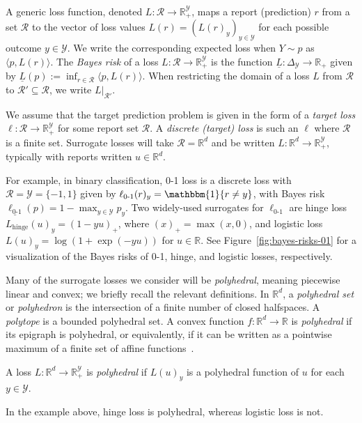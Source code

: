 \documentclass[twoside,11pt]{article}
\newcommand{\Comments}{1}
\newcommand{\mynote}[2]{\ifnum\Comments=1\textcolor{#1}{#2}\fi}
\newcommand{\jessie}[1]{\mynote{teal}{[JF: #1]}}
\newcommand{\reals}{\mathbb{R}}
\newcommand{\simplex}{\Delta_\Y}
\newcommand{\R}{\mathcal{R}}
\newcommand{\U}{\mathcal{U}}
\newcommand{\Y}{\mathcal{Y}}
\newcommand{\risk}[1]{\underline{#1}}
\newcommand{\inprod}[2]{\langle #1, #2 \rangle}%
\newcommand{\ones}{\mathbbm{1}}
\newcommand{\Ind}[1]{\ones\{#1\}}
\newcommand{\hinge}{L_{\mathrm{hinge}}}
\newcommand{\ellzo}{\ell_{\text{0-1}}}
\begin{document}
A generic loss function, denoted $L:\R\to\reals^\Y_+$, maps a report (prediction) $r$ from a set $\R$ to the vector of loss values $L(r) = (L(r)_y)_{y\in\Y}$ for each possible outcome $y\in\Y$.
We write the corresponding expected loss when $Y \sim p$ as $\inprod{p}{L(r)}$.
The \emph{Bayes risk} of a loss $L:\R\to\reals^\Y_+$ is the function $\risk{L}:\simplex\to\reals_+$ given by $\risk{L}(p) := \inf_{r\in\R} \inprod{p}{L(r)}$.
When restricting the domain of a loss $L$ from $\R$ to $\R' \subseteq \R$, we write $L|_{\R'}$.

We assume that the target prediction problem is given in the form of a \emph{target loss} $\ell:\R\to\reals^\Y_+$ for some report set $\R$.
A \emph{discrete (target) loss} is such an $\ell$ where $\R$ is a finite set.
Surrogate losses will take $\R = \reals^d$ and be written $L:\reals^d\to\reals^\Y_+$, typically with reports written $u\in\reals^d$.

For example, in binary classification, 0-1 loss is a discrete loss with $\R = \Y = \{-1,1\}$
given by $\ellzo(r)_y = \Ind{r \neq y}$, with Bayes risk $\risk{\ellzo}(p) = 1-\max_{y\in\Y} p_y$.
Two widely-used surrogates for $\ellzo$ are hinge loss $\hinge(u)_y = (1-yu)_+$, where $(x)_+ = \max(x,0)$, and logistic loss $L(u)_y = \log(1+\exp(-yu))$ for $u\in\reals$.
See Figure~\ref{fig:bayes-risks-01} for a visualization of the Bayes risks of 0-1, hinge, and logistic losses, respectively.

Many of the surrogate losses we consider will be \emph{polyhedral}, meaning piecewise linear and convex; we briefly recall the relevant definitions.
In $\reals^d$, a \emph{polyhedral set} or \emph{polyhedron} is the intersection of a finite number of closed halfspaces.
A \emph{polytope} is a bounded polyhedral set.
A convex function $f:\reals^d\to\reals$ is \emph{polyhedral} if its epigraph is polyhedral, or equivalently, if it can be written as a pointwise maximum of a finite set of affine functions~\citep{rockafellar1997convex}.
%
\begin{definition}
  A loss $L: \reals^d \to \reals^{\Y}_+$ is \emph{polyhedral} if $L(u)_y$ is a polyhedral function of $u$ for each $y\in\Y$.
\end{definition}
\noindent
In the example above, hinge loss is polyhedral, whereas logistic loss is not.
\end{document}
